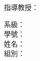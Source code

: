 
\begin{titlepage}
    \begin{center}
        
    
        \vspace*{2cm}
        
        {\Huge \bfseries \underline{\courseTitle} \par}
        {\Huge \bfseries \underline{\reportTitle} \par}
        \vspace{1cm}
        { \Huge \experimentTitle \par}
        
        \vspace{1cm}
        {\Huge 指導教授：\professors \par}
        
        \vspace{3cm}
        {\Huge
        \begin{center}
            系級：\department \\
            學號：\studentID \\
            姓名：\studentName \\
            組別：\groupNumber
        \end{center}
        }
    
        \vfill
    \end{center}
    \end{titlepage}